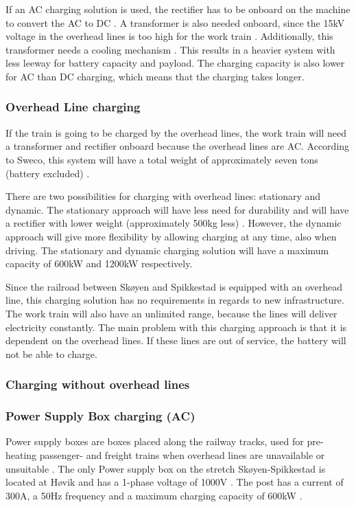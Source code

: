 \documentclass{article}
\begin{document}
If an AC charging solution is used, the rectifier has to be onboard on the machine to convert the AC to DC \cite{sweco}. A transformer is also needed onboard, since the 15kV voltage in the overhead lines is too high for the work train \cite{sweco}. Additionally, this transformer needs a cooling mechanism \cite{sweco}. This results in a heavier system with less leeway for battery capacity and payload. The charging capacity is also lower for AC than DC charging, which means that the charging takes longer.

\subsubsection*{Overhead Line charging}

If the train is going to be charged by the overhead lines, the work train will need a transformer and rectifier onboard because the overhead lines are AC. According to Sweco, this system will have a total weight of approximately seven tons (battery excluded) \cite{sweco}.

There are two possibilities for charging with overhead lines: stationary and dynamic. The stationary approach will have less need for durability and will have a rectifier with lower weight (approximately 500kg less) \cite{sweco}. However, the dynamic approach will give more flexibility by allowing charging at any time, also when driving. The stationary and dynamic charging solution will have a maximum capacity of 600kW and 1200kW respectively.

Since the railroad between Skøyen and Spikkestad is equipped with an overhead line, this charging solution has no requirements in regards to new infrastructure. The work train will also have an unlimited range, because the lines will deliver electricity constantly. The main problem with this charging approach is that it is dependent on the overhead lines. If these lines are out of service, the battery will not be able to charge.

\subsubsection*{Charging without overhead lines}

\subsubsection*{Power Supply Box charging (AC)}

Power supply boxes are boxes placed along the railway tracks, used for pre-heating passenger- and freight trains when overhead lines are unavailable or unsuitable \cite{trv}. %
The only Power supply box on the stretch Skøyen-Spikkestad is located at Høvik and has a 1-phase voltage of 1000V \cite{togvarme}.%
The post has a current of 300A, a 50Hz frequency and a maximum charging capacity of 600kW \cite{togvarme}\cite{sweco}.%
\end{document}
